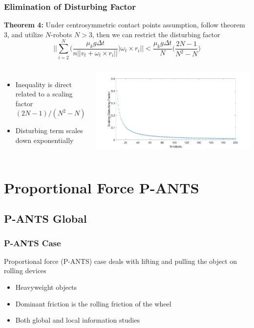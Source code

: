 \documentclass{beamer}
\begin{document}
\begin{frame}
\frametitle{Elimination of Disturbing Factor}

\textbf{Theorem 4:} Under centrosymmetric contact points assumption, follow theorem 3, and utilize $N$-robots $N>3$, then we can restrict the disturbing factor
\begin{equation}
\Bigg| \Bigg| \sum_{i=2}^N \Bigg( \frac{\mu_k g \Delta t}{n||v_t+ \omega_t \times r_i||} \Bigg)\omega_t \times r_i \Bigg| \Bigg|< \frac{\mu_k g \Delta t}{N} \Bigg( \frac{2N-1}{N^2-N} \Bigg)
\end{equation}

\begin{columns}[c] 
\begin{itemize}
\item Inequality is direct related to a scaling factor $(2N-1)/(N^2-N)$
\item Disturbing term scales down exponentially 
\end{itemize}

\centering
 \includegraphics[width=1.1\textwidth]{figures/scalingFactorDisturbance.png}\\
\end{columns}

\end{frame}

\section{Proportional Force P-ANTS}
\subsection{P-ANTS Global}
\begin{frame}
\frametitle{P-ANTS Case}
Proportional force (P-ANTS) case deals with lifting and pulling the object on rolling devices \vspace{.3cm}
\begin{itemize}
\item Heavyweight objects\vspace{.3cm}
\item Dominant friction is the rolling friction of the wheel\vspace{.3cm}
\item Both global and local information studies
\end{itemize}
\end{frame}
\end{document}
